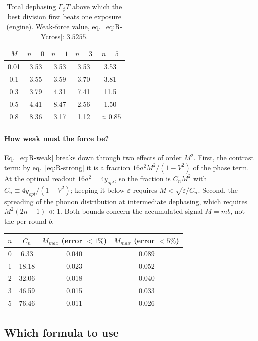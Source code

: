 \begin{table}[h]
\centering
\begin{tabular}{c c c c c}
\hline
$M$ & $n = 0$ & $n = 1$ & $n = 3$ & $n = 5$ \\
\hline
0.01 & 3.53 & 3.53 & 3.53 & 3.53 \\
0.1  & 3.55 & 3.59 & 3.70 & 3.81 \\
0.3  & 3.79 & 4.31 & 7.41 & 11.5 \\
0.5  & 4.41 & 8.47 & 2.56 & 1.50 \\
0.8  & 8.36 & 3.17 & 1.12 & $\approx 0.85$ \\
\hline
\end{tabular}
\caption{Total dephasing $\Gamma_\phi T$ above which the best division first beats one exposure (engine). Weak-force value, eq.~\eqref{eq:R-Ycross}: $3.5255$.}
\label{tab:R-dephcross}
\end{table}

\paragraph{How weak must the force be?} Eq.~\eqref{eq:R-weak} breaks down through two effects of order $M^2$. First, the contrast term: by eq.~\eqref{eq:R-strong} it is a fraction $16a^2M^2/(1 - V^2)$ of the phase term. At the optimal readout $16a^2 = 4y_{opt}$, so the fraction is $C_nM^2$ with $C_n \equiv 4y_{opt}/(1 - V^2)$; keeping it below $\varepsilon$ requires $M < \sqrt{\varepsilon/C_n}$. Second, the spreading of the phonon distribution at intermediate dephasing, which requires $M^2(2n+1) \ll 1$. Both bounds concern the accumulated signal $M = mb$, not the per-round $b$.
\begin{center}
\begin{tabular}{c c c c}
\hline
$n$ & $C_n$ & $M_{max}$ (error $<1\%$) & $M_{max}$ (error $<5\%$) \\
\hline
0 & 6.33 & 0.040 & 0.089 \\
1 & 18.18 & 0.023 & 0.052 \\
2 & 32.06 & 0.018 & 0.040 \\
3 & 46.59 & 0.015 & 0.033 \\
5 & 76.46 & 0.011 & 0.026 \\
\hline
\end{tabular}
\end{center}

\subsection{Which formula to use}
\label{sec:rep-regimes}

